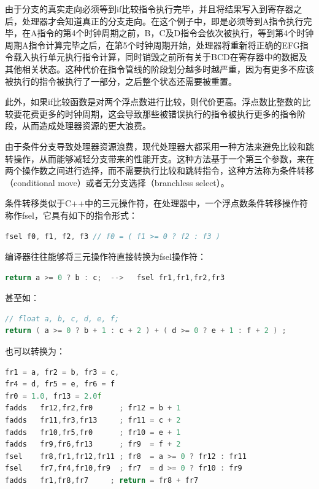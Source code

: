 由于分支的真实走向必须等到if比较指令执行完毕，并且将结果写入到寄存器之后，处理器才会知道真正的分支走向。在这个例子中，即是必须等到A指令执行完毕，在A指令的第4个时钟周期之前，B，C及D指令会依次被执行，等到第4个时钟周期A指令计算完毕之后，在第5个时钟周期开始，处理器将重新将正确的EFG指令载入执行单元执行指令计算，同时销毁之前所有关于BCD在寄存器中的数据及其他相关状态。这种代价在指令管线的阶段划分越多时越严重，因为有更多不应该被执行的指令被执行了一部分，之后整个状态还需要被重置。

此外，如果if比较函数是对两个浮点数进行比较，则代价更高。浮点数比整数的比较要花费更多的时钟周期，这会导致那些被错误执行的指令被执行更多的指令阶段，从而造成处理器资源的更大浪费。

由于条件分支导致处理器资源浪费，现代处理器大都采用一种方法来避免比较和跳转操作，从而能够减轻分支带来的性能开支。这种方法基于一个第三个参数，来在两个操作数之间进行选择，而不需要执行比较和跳转指令，这种方法称为条件转移（conditional move）或者无分支选择（branchless select）。

条件转移类似于C++中的三元操作符，在处理器中，一个浮点数条件转移操作符称作fsel，它具有如下的指令形式：

\begin{lstlisting}[language=C++]
fsel f0, f1, f2, f3 // f0 = ( f1 >= 0 ? f2 : f3 )
\end{lstlisting}

编译器往往能够将三元操作符直接转换为fsel操作符：

\begin{lstlisting}[language=C++]
	return a >= 0 ? b : c;	-->   fsel fr1,fr1,fr2,fr3
\end{lstlisting}

甚至如：

\begin{lstlisting}[language=C++]
// float a, b, c, d, e, f;
return ( a >= 0 ? b + 1 : c + 2 ) + ( d >= 0 ? e + 1 : f + 2 ) ;
\end{lstlisting}
也可以转换为：

\begin{lstlisting}[language=C++]
fr1 = a, fr2 = b, fr3 = c,
fr4 = d, fr5 = e, fr6 = f
fr0 = 1.0, fr13 = 2.0f
fadds   fr12,fr2,fr0      ; fr12 = b + 1
fadds   fr11,fr3,fr13     ; fr11 = c + 2
fadds   fr10,fr5,fr0      ; fr10 = e + 1
fadds   fr9,fr6,fr13      ; fr9  = f + 2
fsel    fr8,fr1,fr12,fr11 ; fr8  = a >= 0 ? fr12 : fr11
fsel    fr7,fr4,fr10,fr9  ; fr7  = d >= 0 ? fr10 : fr9
fadds   fr1,fr8,fr7     ; return = fr8 + fr7
\end{lstlisting}

